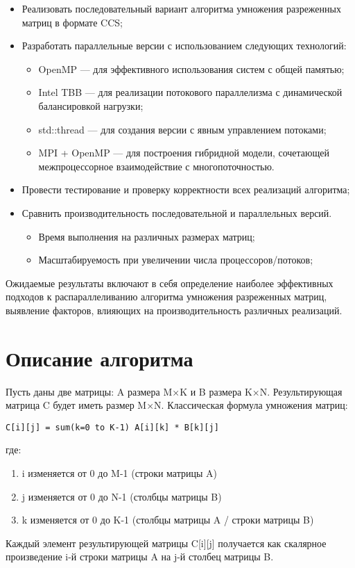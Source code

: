 \documentclass[12pt]{article}
\begin{document}
\begin{itemize}
\item Реализовать последовательный вариант алгоритма умножения разреженных матриц в формате CCS;
\item Разработать параллельные версии с использованием следующих технологий:
\begin{itemize}
\item OpenMP — для эффективного использования систем с общей памятью;
\item Intel TBB — для реализации потокового параллелизма с динамической балансировкой нагрузки;
\item std::thread — для создания версии с явным управлением потоками;
\item MPI + OpenMP — для построения гибридной модели, сочетающей межпроцессорное взаимодействие с многопоточностью.
\end{itemize}
\item Провести тестирование и проверку корректности всех реализаций алгоритма;
\item Сравнить производительность последовательной и параллельных версий.
\begin{itemize}
\item Время выполнения на различных размерах матриц;
\item Масштабируемость при увеличении числа процессоров/потоков;
\end{itemize}
\end{itemize}

Ожидаемые результаты включают в себя определение наиболее эффективных подходов к распараллеливанию алгоритма умножения разреженных матриц, выявление факторов, влияющих на производительность различных реализаций.

\section{Описание алгоритма}

Пусть даны две матрицы: A размера M×K и B размера K×N. Результирующая матрица C будет иметь размер M×N.
Классическая формула умножения матриц:
\begin{lstlisting}
C[i][j] = sum(k=0 to K-1) A[i][k] * B[k][j]
\end{lstlisting}
где:
\begin{enumerate}
\item i изменяется от 0 до M-1 (строки матрицы A)
\item j изменяется от 0 до N-1 (столбцы матрицы B)
\item k изменяется от 0 до K-1 (столбцы матрицы A / строки матрицы B)
\end{enumerate}
Каждый элемент результирующей матрицы C[i][j] получается как скалярное произведение i-й строки матрицы A на j-й столбец матрицы B.
\end{document}
